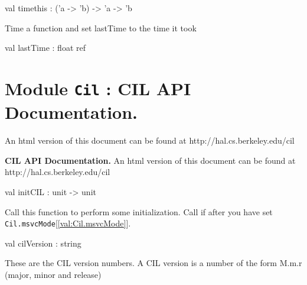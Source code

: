 \documentclass[11pt]{article}
\begin{document}
\label{val:Stats.timethis}\begin{ocamldoccode}
val timethis : ('a -> 'b) -> 'a -> 'b
\end{ocamldoccode}
\begin{ocamldocdescription}
Time a function and set lastTime to the time it took


\end{ocamldocdescription}




\label{val:Stats.lastTime}\begin{ocamldoccode}
val lastTime : float ref
\end{ocamldoccode}


\section{Module {\tt{Cil}} : {\bf CIL API Documentation.}}
\label{module:Cil}
{\bf }  An html version of this document 
  can be found at http://hal.cs.berkeley.edu/cil



\ocamldocvspace{0.5cm}



{\bf CIL API Documentation.}  An html version of this document 
  can be found at http://hal.cs.berkeley.edu/cil



\label{val:Cil.initCIL}\begin{ocamldoccode}
val initCIL : unit -> unit
\end{ocamldoccode}
\begin{ocamldocdescription}
Call this function to perform some initialization. Call if after you have 
 set {\tt{Cil.msvcMode}}[\ref{val:Cil.msvcMode}].


\end{ocamldocdescription}




\label{val:Cil.cilVersion}\begin{ocamldoccode}
val cilVersion : string
\end{ocamldoccode}
\begin{ocamldocdescription}
These are the CIL version numbers. A CIL version is a number of the form 
 M.m.r (major, minor and release)


\end{ocamldocdescription}
\end{document}
